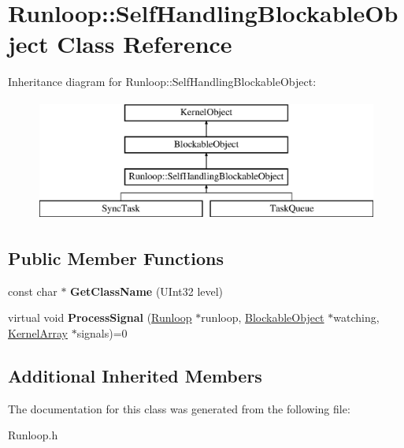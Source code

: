 \hypertarget{class_runloop_1_1_self_handling_blockable_object}{}\section{Runloop\+:\+:Self\+Handling\+Blockable\+Object Class Reference}
\label{class_runloop_1_1_self_handling_blockable_object}
Inheritance diagram for Runloop\+:\+:Self\+Handling\+Blockable\+Object\+:\begin{figure}[H]
\begin{center}
\leavevmode
\includegraphics[height=4.000000cm]{class_runloop_1_1_self_handling_blockable_object}
\end{center}
\end{figure}
\subsection*{Public Member Functions}
\begin{DoxyCompactItemize}
\item 
\mbox{\label{class_runloop_1_1_self_handling_blockable_object_ae16434a28db0d98fa32337b1e2696b1d}} 
const char $\ast$ {\bfseries Get\+Class\+Name} (U\+Int32 level)
\item 
\mbox{\label{class_runloop_1_1_self_handling_blockable_object_a43459697bcd7790f9dbe14353275c13e}} 
virtual void {\bfseries Process\+Signal} (\hyperlink{class_runloop}{Runloop} $\ast$runloop, \hyperlink{class_blockable_object}{Blockable\+Object} $\ast$watching, \hyperlink{class_kernel_array}{Kernel\+Array} $\ast$signals)=0
\end{DoxyCompactItemize}
\subsection*{Additional Inherited Members}


The documentation for this class was generated from the following file\+:\begin{DoxyCompactItemize}
\item 
Runloop.\+h\end{DoxyCompactItemize}
